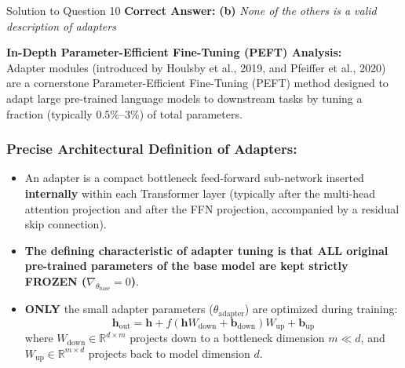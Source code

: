 \documentclass[11pt,a4paper]{article}
\begin{document}
\begin{solutionbox}{Solution to Question 10}
\textbf{Correct Answer:} \textbf{(b)} \textit{None of the others is a valid description of adapters}

\medskip
\textbf{In-Depth Parameter-Efficient Fine-Tuning (PEFT) Analysis:}\\
Adapter modules (introduced by Houlsby et al., 2019, and Pfeiffer et al., 2020) are a cornerstone Parameter-Efficient Fine-Tuning (PEFT) method designed to adapt large pre-trained language models to downstream tasks by tuning a fraction (typically $0.5\%$--$3\%$) of total parameters.

\subsubsection*{Precise Architectural Definition of Adapters:}
\begin{itemize}
    \item An adapter is a compact bottleneck feed-forward sub-network inserted \textbf{internally} within each Transformer layer (typically after the multi-head attention projection and after the FFN projection, accompanied by a residual skip connection).
    \item \textbf{The defining characteristic of adapter tuning is that ALL original pre-trained parameters of the base model are kept strictly FROZEN ($\nabla_{\theta_{\text{base}}} = 0$)}.
    \item \textbf{ONLY} the small adapter parameters ($\theta_{\text{adapter}}$) are optimized during training:
    \begin{equation*}
    \mathbf{h}_{\text{out}} = \mathbf{h} + f\left(\mathbf{h} W_{\text{down}} + \mathbf{b}_{\text{down}}\right) W_{\text{up}} + \mathbf{b}_{\text{up}}
    \end{equation*}
    where $W_{\text{down}} \in \mathbb{R}^{d \times m}$ projects down to a bottleneck dimension $m \ll d$, and $W_{\text{up}} \in \mathbb{R}^{m \times d}$ projects back to model dimension $d$.
\end{itemize}


\end{solutionbox}
\end{document}
